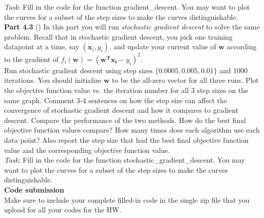   \noindent \emph{Task}: Fill in the code for the function \colorbox{Gainsboro!60!Lavender}{gradient\_descent}. You may want to plot the curves for a subset of the step sizes to make the curves distinguishable. \\

\textbf{Part 4.3} ()
In this part you will run \emph{stochastic gradient descent} to solve the same problem.  Recall that in stochastic gradient descent, you pick one training datapoint at a time, say $(\textbf{x}_i,y_i)$, and update your current value of $\textbf{w}$ according to the gradient of $f_i(\mathbf{w})=(\mathbf{w^T x_i}-y_i)^2$. \\

Run stochastic gradient descent using step sizes
$\{0.0005, 0.005, 0.01\}$ and 1000 iterations. You should initialize $\mathbf{w}$ to be the all-zero vector for all three runs. Plot the objective
function value vs. the iteration number for all 3 step sizes on the
same graph. Comment 3-4 sentences on how the step size can affect the
convergence of stochastic gradient descent and how it compares to
gradient descent. Compare the performance of the two methods. How do
the best final objective function values compare? How many times does
each algorithm use each data point? Also report the step size that had
the best final objective function value and the
corresponding objective function value.\\

\noindent \emph{Task}: Fill in the code for the function \colorbox{Gainsboro!60!Lavender}{stochastic\_gradient\_descent}. You may want to plot the curves for a subset of the step sizes to make the curves distinguishable. \\

\textbf{Code submission}\\

Make sure to include your complete filled-in code in the single zip file that you upload for all your codes for the HW.